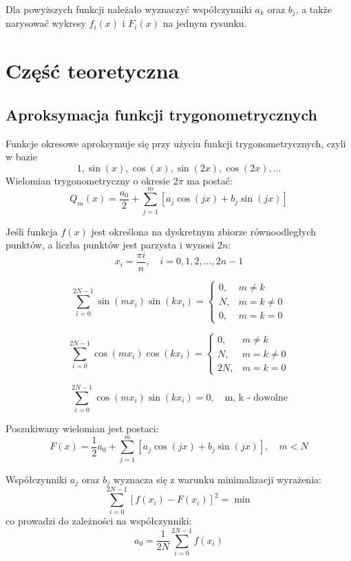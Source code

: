 \documentclass{article}
\begin{document}
\noindent
Dla powyższych funkcji należało wyznaczyć współczynniki $a_k$ oraz $b_j$, a także narysować wykresy $f_i(x)$ i $F_i(x)$ na jednym rysunku.

\section{Część teoretyczna}

\subsection{Aproksymacja funkcji trygonometrycznych}

 Funkcje okresowe aproksymuje się przy użyciu funkcji trygonometrycznych, czyli w bazie
    \[
    1, \sin(x), \cos(x), \sin(2x), \cos(2x), \ldots
    \]
\noindent
Wielomian trygonometryczny o okresie \(2\pi\) ma postać:
    \[
    Q_m(x) = \frac{a_0}{2} + \sum_{j=1}^m \left[ a_j \cos(jx) + b_j \sin(jx) \right]
    \]

\noindent
Jeśli funkcja \(f(x)\) jest określona na dyskretnym zbiorze równoodległych punktów, a liczba punktów jest parzysta i wynosi \(2n\):
    \[
    x_i = \frac{\pi i}{n}, \quad i = 0, 1, 2, \ldots, 2n-1
    \]

    \begin{equation*}
    \sum_{i=0}^{2N-1} \sin(mx_i) \sin(kx_i) =
    \begin{cases} 
    0, & m \neq k \\
    N, & m = k \neq 0 \\
    0, & m = k = 0 
    \end{cases}
    \end{equation*}

    \begin{equation*}
    \sum_{i=0}^{2N-1} \cos(mx_i) \cos(kx_i) =
    \begin{cases} 
    0, & m \neq k \\
    N, & m = k \neq 0 \\
    2N, & m = k = 0 
    \end{cases}
    \end{equation*}

    \[
    \sum_{i=0}^{2N-1} \cos(mx_i) \sin(kx_i) = 0, \quad \text{m, k - dowolne}
    \]

\noindent
Poszukiwany wielomian jest postaci:
\[
F(x) = \frac{1}{2} a_0 + \sum_{j=1}^{m} \left[ a_j \cos(jx) + b_j \sin(jx) \right], \quad m < N
\]

\noindent
Współczynniki \(a_j\) oraz \(b_j\) wyznacza się z warunku minimalizacji wyrażenia:
\[
\sum_{i=0}^{2N-1} \left[ f(x_i) - F(x_i) \right]^2 = \min
\]
\noindent
co prowadzi do zależności na współczynniki:
\[
a_0 = \frac{1}{2N} \sum_{i=0}^{2N-1} f(x_i)
\]
\end{document}
